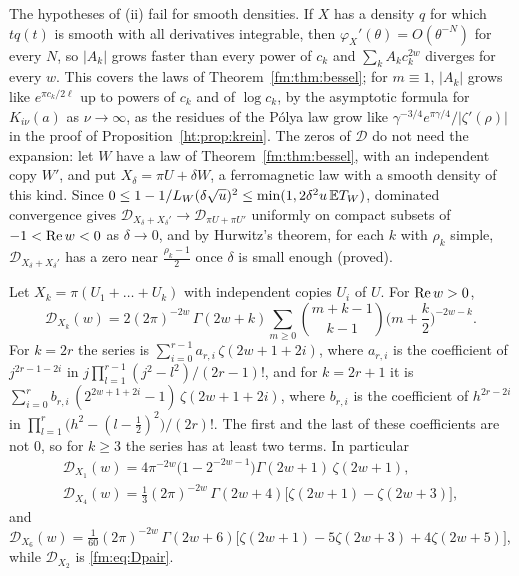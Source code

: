 The hypotheses of (ii) fail for smooth densities. If $X$ has a density $q$ for which $tq(t)$ is smooth with all derivatives integrable, then $\varphi_X'(\theta)=O(\theta^{-N})$ for every $N$, so $|A_k|$ grows faster than every power of $c_k$ and $\sum_kA_kc_k^{2w}$ diverges for every $w$. This covers the laws of Theorem~\ref{fm:thm:bessel}; for $m\equiv1$, $|A_k|$ grows like $e^{\pi c_k/2\ell}$ up to powers of $c_k$ and of $\log c_k$, by the asymptotic formula for $K_{i\nu}(a)$ as $\nu\to\infty$, as the residues of the P\'olya law grow like $\gamma^{-3/4}e^{\pi\gamma/4}/|\zeta'(\rho)|$ in the proof of Proposition~\ref{ht:prop:krein}. The zeros of $\mathcal D$ do not need the expansion: let $W$ have a law of Theorem~\ref{fm:thm:bessel}, with an independent copy $W'$, and put $X_\delta=\pi U+\delta W$, a ferromagnetic law with a smooth density of this kind. Since $0\le1-1/L_W(\delta\sqrt u)^2\le\min(1,2\delta^2u\,\mathbb{E} T_W)$, dominated convergence gives $\mathcal D_{X_\delta+X_\delta'}\to\mathcal D_{\pi U+\pi U'}$ uniformly on compact subsets of $-1<\operatorname{Re} w<0$ as $\delta\to0$, and by Hurwitz's theorem, for each $k$ with $\rho_k$ simple, $\mathcal D_{X_\delta+X_\delta'}$ has a zero near $\frac{\rho_k-1}2$ once $\delta$ is small enough (proved).

\begin{proposition}\label{fm:prop:kspins}
Let $X_k=\pi(U_1+\dots+U_k)$ with independent copies $U_i$ of $U$. For $\operatorname{Re} w>0$,
\[
\mathcal D_{X_k}(w)=2(2\pi)^{-2w}\,\Gamma(2w+k)\sum_{m\ge0}\binom{m+k-1}{k-1}\Big(m+\frac k2\Big)^{-2w-k}.
\]
For $k=2r$ the series is $\sum_{i=0}^{r-1}a_{r,i}\,\zeta(2w+1+2i)$, where $a_{r,i}$ is the coefficient of $j^{2r-1-2i}$ in $j\prod_{l=1}^{r-1}(j^2-l^2)/(2r-1)!$, and for $k=2r+1$ it is $\sum_{i=0}^rb_{r,i}\,(2^{2w+1+2i}-1)\,\zeta(2w+1+2i)$, where $b_{r,i}$ is the coefficient of $h^{2r-2i}$ in $\prod_{l=1}^r\big(h^2-(l-\frac12)^2\big)/(2r)!$. The first and the last of these coefficients are not $0$, so for $k\ge3$ the series has at least two terms. In particular
\begin{gather*}
\mathcal D_{X_1}(w)=4\pi^{-2w}\big(1-2^{-2w-1}\big)\Gamma(2w+1)\,\zeta(2w+1),\\
\mathcal D_{X_4}(w)=\tfrac13(2\pi)^{-2w}\,\Gamma(2w+4)\big[\zeta(2w+1)-\zeta(2w+3)\big],
\end{gather*}
and $\mathcal D_{X_6}(w)=\frac1{60}(2\pi)^{-2w}\,\Gamma(2w+6)\big[\zeta(2w+1)-5\zeta(2w+3)+4\zeta(2w+5)\big]$, while $\mathcal D_{X_2}$ is \eqref{fm:eq:Dpair}.
\end{proposition}

